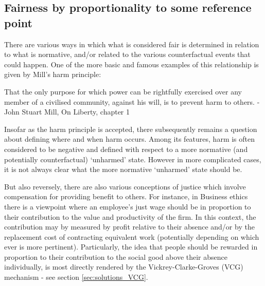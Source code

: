 \subsection{Fairness by proportionality to some reference point}\label{sec:reference_points}

There are various ways in which what is considered fair is determined in relation to what is normative, and/or related to the various counterfactual events that could happen.
One of the more basic and famous examples of this relationship is given by Mill's harm principle:

\begin{displayquote}
That the only purpose for which power can be rightfully exercised over any member of a civilised community, against his will, is to prevent harm to others. - John Stuart Mill, On Liberty, chapter 1 \cite{Mill2Gutenberg}
\end{displayquote}

Insofar as the harm principle is accepted, there subsequently remains a question about defining where and when harm occurs.
Among its features, harm is often considered to be negative and defined with respect to a more normative (and potentially counterfactual) `unharmed' state.
However in more complicated cases, it is not always clear what the more normative `unharmed' state should be.%

But also reversely, there are also various conceptions of justice which involve compensation for providing benefit to others.
For instance, in Business ethics there is a viewpoint where an employee's just wage should be in proportion to their contribution to the value and productivity of the firm.\cite{sternberg2000just}
In this context, the contribution may by measured by profit relative to their absence and/or by the replacement cost of contracting equivalent work (potentially depending on which ever is more pertinent).
Particularly, the idea that people should be rewarded in proportion to their contribution to the social good above their absence individually, is most directly rendered by the Vickrey-Clarke-Groves (VCG) mechanism - see section \ref{sec:solutions_VCG}.


